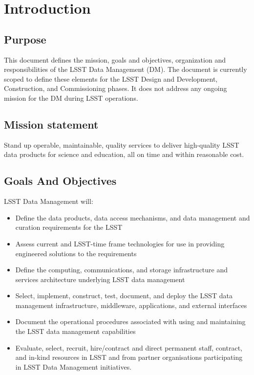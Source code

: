 \section{Introduction}
\subsection{Purpose}
This document defines the mission, goals and objectives, organization and responsibilities of the LSST Data Management (DM).  The document is currently scoped to define these elements for the LSST Design and Development, Construction, and Commissioning phases.  It does not address any ongoing mission for the DM during LSST operations.

\subsection{Mission statement}
Stand up operable, maintainable, quality services to deliver high-quality LSST data products for science and education, all on time and within reasonable cost.

\subsection{Goals And Objectives}
LSST Data Management will:
\begin{itemize}
\item Define the data products, data access mechanisms, and data management and curation requirements for the LSST
\item Assess current and LSST-time frame technologies for use in providing engineered solutions to the requirements
\item Define the computing, communications, and storage infrastructure and services architecture underlying LSST data management
\item Select, implement, construct, test, document, and deploy the LSST data management infrastructure, middleware, applications, and external interfaces
\item Document the operational procedures associated with using and maintaining the LSST data management capabilities
\item Evaluate, select, recruit, hire/contract and direct permanent staff, contract, and in-kind resources in LSST and from partner organisations participating in LSST Data Management initiatives.

\end{itemize}


